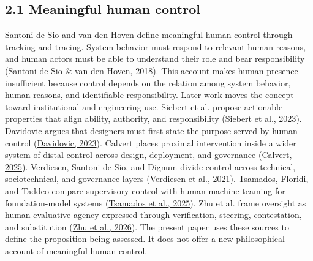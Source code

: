 \documentclass[11pt]{article}
\begin{document}
\subsection*{2.1 Meaningful human control}
Santoni de Sio and van den Hoven define meaningful human control through tracking and tracing. System behavior must respond to relevant human reasons, and human actors must be able to understand their role and bear responsibility (\href{https://doi.org/10.3389/frobt.2018.00015}{Santoni de Sio \& van den Hoven, 2018}). This account makes human presence insufficient because control depends on the relation among system behavior, human reasons, and identifiable responsibility.
Later work moves the concept toward institutional and engineering use. Siebert et al. propose actionable properties that align ability, authority, and responsibility (\href{https://doi.org/10.1007/s43681-022-00167-3}{Siebert et al., 2023}). Davidovic argues that designers must first state the purpose served by human control (\href{https://doi.org/10.3389/fdata.2022.1017677}{Davidovic, 2023}). Calvert places proximal intervention inside a wider system of distal control across design, deployment, and governance (\href{https://doi.org/10.1007/s11948-025-00554-z}{Calvert, 2025}). Verdiesen, Santoni de Sio, and Dignum divide control across technical, sociotechnical, and governance layers (\href{https://doi.org/10.1007/s11023-020-09532-9}{Verdiesen et al., 2021}). Tsamados, Floridi, and Taddeo compare supervisory control with human-machine teaming for foundation-model systems (\href{https://doi.org/10.1007/s43681-024-00489-4}{Tsamados et al., 2025}). Zhu et al. frame oversight as human evaluative agency expressed through verification, steering, contestation, and substitution (\href{https://doi.org/10.1007/s43681-026-01147-7}{Zhu et al., 2026}).
The present paper uses these sources to define the proposition being assessed. It does not offer a new philosophical account of meaningful human control.
\end{document}
